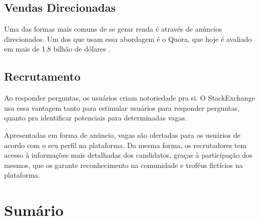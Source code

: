 \subsection{Vendas Direcionadas}
Uma das formas mais comuns de se gerar renda é através de anúncios direcionados. Um dos que usam essa abordagem é o Quora, que hoje é avaliado em mais de 1,8 bilhão de dólares \cite{quorarevenuemodel}.

\subsection{Recrutamento}
Ao responder perguntas, os usuários criam notoriedade pra si. O StackExchange usa essa vantagem tanto para estimular usuários para responder perguntas, quanto pra identificar potenciais para determinadas vagas.

Apresentadas em forma de anúncio, vagas são ofertadas para os usuários de acordo com o seu perfil na plataforma. Da mesma forma, os recrutadores tem acesso à informações mais detalhadas dos candidatos, graças à participação dos mesmos, que os garante reconhecimento na comunidade e troféus fictícios na plataforma.

\section{Sumário}